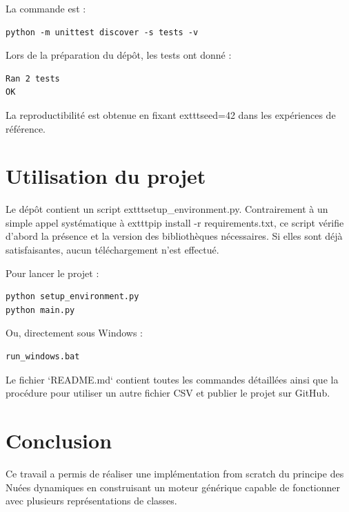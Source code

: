 \documentclass[12pt,a4paper]{article}
\begin{document}
La commande est :

\begin{verbatim}
python -m unittest discover -s tests -v
\end{verbatim}

Lors de la préparation du dépôt, les tests ont donné :

\begin{verbatim}
Ran 2 tests
OK
\end{verbatim}

La reproductibilité est obtenue en fixant 	exttt{seed=42} dans les expériences de référence.

\section{Utilisation du projet}

Le dépôt contient un script 	exttt{setup\_environment.py}. Contrairement à un simple appel systématique à 	exttt{pip install -r requirements.txt}, ce script vérifie d'abord la présence et la version des bibliothèques nécessaires. Si elles sont déjà satisfaisantes, aucun téléchargement n'est effectué.

Pour lancer le projet :

\begin{verbatim}
python setup_environment.py
python main.py
\end{verbatim}

Ou, directement sous Windows :

\begin{verbatim}
run_windows.bat
\end{verbatim}

Le fichier `README.md` contient toutes les commandes détaillées ainsi que la procédure pour utiliser un autre fichier CSV et publier le projet sur GitHub.

\section{Conclusion}

Ce travail a permis de réaliser une implémentation from scratch du principe des Nuées dynamiques en construisant un moteur générique capable de fonctionner avec plusieurs représentations de classes.
\end{document}
